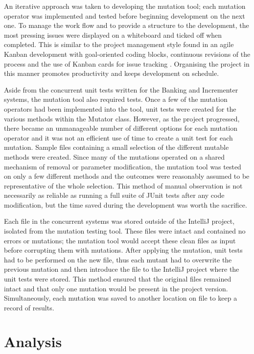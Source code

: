 \documentclass[a4paper,12pt]{article}
\begin{document}
An iterative approach was taken to developing the mutation tool; each mutation operator was implemented and tested before beginning development on the next one. To manage the work flow and to provide a structure to the development, the most pressing issues were displayed on a whiteboard and ticked off when completed. This is similar to the project management style found in an agile Kanban development with goal-oriented coding blocks, continuous revisions of the process and the use of Kanban cards for issue tracking \citep{radigan19}. Organising the project in this manner promotes productivity and keeps development on schedule.

Aside from the concurrent unit tests written for the Banking and Incrementer systems, the mutation tool also required tests. Once a few of the mutation operators had been implemented into the tool, unit tests were created for the various methods within the Mutator class. However, as the project progressed, there became an unmanageable number of different options for each mutation operator and it was not an efficient use of time to create a unit test for each mutation. Sample files containing a small selection of the different mutable methods were created. Since many of the mutations operated on a shared mechanism of removal or parameter modification, the mutation tool was tested on only a few different methods and the outcomes were reasonably assumed to be representative of the whole selection. This method of manual observation is not necessarily as reliable as running a full suite of JUnit tests after any code modification, but the time saved during the development was worth the sacrifice.   

Each file in the concurrent systems was stored outside of the IntelliJ project, isolated from the mutation testing tool. These files were intact and contained no errors or mutations; the mutation tool would accept these clean files as input before corrupting them with mutations. After applying the mutation, unit tests had to be performed on the new file, thus each mutant had to overwrite the previous mutation and then introduce the file to the IntelliJ project where the unit tests were stored. This method ensured that the original files remained intact and that only one mutation would be present in the project version. Simultaneously, each mutation was saved to another location on file to keep a record of results.


\newpage	
\section{Analysis} \label{section:Analysis}
\end{document}

